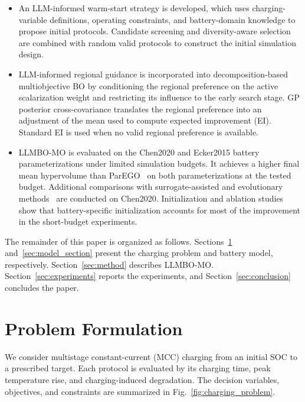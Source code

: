 \documentclass[journal]{IEEEtran}
\begin{document}
\begin{itemize}

    \item An LLM-informed warm-start strategy is developed, which uses
    charging-variable definitions, operating constraints, and battery-domain
    knowledge to propose initial protocols. Candidate screening and
    diversity-aware selection are combined with random valid protocols to
    construct the initial simulation design.

    \item LLM-informed regional guidance is incorporated into
    decomposition-based multiobjective BO by conditioning the regional
    preference on the active scalarization weight and restricting its
    influence to the early search stage. GP posterior cross-covariance
    translates the regional preference into an adjustment of the mean used
    to compute expected improvement (EI). Standard EI is used when no
    valid regional preference is available.

    \item LLMBO-MO is evaluated on the Chen2020 and Ecker2015 battery
    parameterizations under limited simulation budgets. It achieves a higher
    final mean hypervolume than ParEGO~\cite{ref4} on both parameterizations
    at the tested budget. Additional comparisons with surrogate-assisted
    and evolutionary methods~\cite{refDISK,refPIMD,refNSGAII} are conducted
    on Chen2020. Initialization and ablation studies show that battery-specific
    initialization accounts for most of the improvement in the short-budget
    experiments.

\end{itemize}

The remainder of this paper is organized as follows.
Sections~\ref{sec:problem} and~\ref{sec:model_section} present the charging
problem and battery model, respectively. Section~\ref{sec:method} describes
LLMBO-MO. Section~\ref{sec:experiments} reports the experiments, and
Section~\ref{sec:conclusion} concludes the paper.

\section{Problem Formulation}
\label{sec:problem}

We consider multistage constant-current (MCC) charging from an initial SOC to
a prescribed target. Each protocol is evaluated by its charging time, peak
temperature rise, and charging-induced degradation. The decision variables,
objectives, and constraints are summarized in
Fig.~\ref{fig:charging_problem}.
\end{document}
